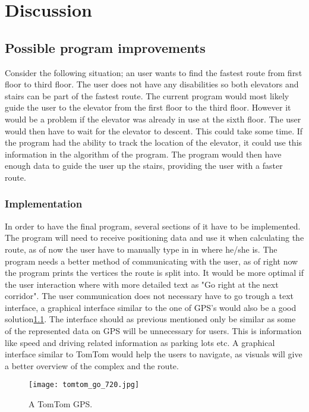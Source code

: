 \chapter{Discussion}

\section{Possible program improvements}

Consider the following situation; an user wants to find the fastest route from first floor to third floor. The user does not have any disabilities so both elevators and stairs can be part of the fastest route. The current program would most likely guide the user to the elevator from the first floor to the third floor. However it would be a problem if the elevator was already in use at the sixth floor. The user would then have to wait for the elevator to descent. This could take some time. If the program had the ability to track the location of the elevator, it could use this information in the algorithm of the program. The program would then have enough data to guide the user up the stairs, providing the user with a faster route.

\subsection{Implementation}

In order to have the final program, several sections of it have to be implemented. The program will need to receive positioning data and use it when calculating the route, as of now the user have to manually type in in where he/she is. The program needs a better method of communicating with the user, as of right now the program prints the vertices the route is split into. It would be more optimal if the user interaction where with more detailed text as "Go right at the next corridor". The user communication does not necessary have to go trough a text interface, a graphical interface similar to the one of GPS's would also be a good solution\cref{fig:TomTom}. The interface should as previous mentioned only be similar as some of the represented data on GPS will be unnecessary for users. This is information like speed and driving related information as parking lots etc. A graphical interface similar to TomTom would help the users to navigate, as visuals will give a better overview of the complex and the route. 

\begin{figure}
\centering
  \begin{minipage}{0.45\textwidth}
    \centering
    \texttt{[image: tomtom\_go\_720.jpg]}
    \caption{A TomTom GPS. \cite{diss_tomtom}} \label{fig:TomTom}
  \end{minipage}
\end{figure}


